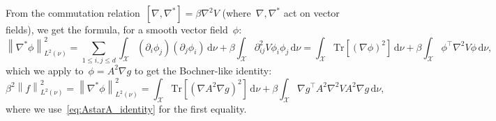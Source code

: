\documentclass[10pt]{article}
\renewcommand{\d}{\mathrm{d}}
\newcommand{\cX}{\mathcal{X}}
\newcommand{\1}{\mathbbm 1}
\begin{document}
From the commutation relation~$[\nabla,\nabla^*] = \beta\nabla^2 V$ (where~$\nabla,\nabla^*$ act on vector fields), we get the formula, for a smooth vector field~$\phi$:
\begin{equation}
    \left\|\nabla^* \phi\right\|^2_{L^2(\nu)} = \sum_{1\leq i,j\leq d}\int_{\cX}(\partial_i \phi_j)(\partial_j\phi_i)\,\d \nu + \beta\int_{\cX}\partial_{ij}^2 V \phi_i\phi_j\,\d \nu = \int_{\cX}\mathrm{Tr}\left[\left(\nabla\phi\right)^2\right]\,\d\nu + \beta\int_{\cX}\phi^\top \nabla^2V\phi\,\d \nu,
\end{equation}
which we apply to~$\phi = A^2\nabla g$ to get the Bochner-like identity:
\begin{equation}
    \label{eq:bochner_identity}
    \beta^2\left\|f\right\|^2_{L^2(\nu)}=\left\|\nabla^*\phi\right\|^2_{L^2(\nu)} = \int_{\cX}\mathrm{Tr}\left[\left(\nabla A^2\nabla g\right)^2\right]\,\d \nu + \beta\int_{\cX}\nabla g^\top A^2\nabla^2 V A^2 \nabla g\,\d\nu,
\end{equation}
where we use~\eqref{eq:AstarA_identity} for the first equality.
\end{document}
